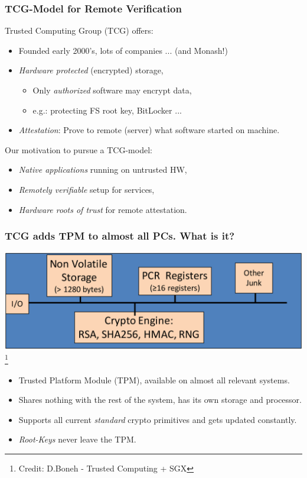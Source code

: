 \documentclass[aspectratio=169] {beamer}
\begin{document}
\begin{frame}\frametitle{TCG-Model for Remote Verification}
	\begin{minipage}{6.5cm}
	Trusted Computing Group (TCG) offers:
		\begin{itemize}
			\item Founded early 2000's, lots of companies ... (and Monash!)
			\item \emph{Hardware protected} (encrypted) storage,
			\begin{itemize}
				\item Only \emph{authorized} software may encrypt data,
				\item e.g.: protecting FS root key, BitLocker ...
			\end{itemize}
			\item \emph{Attestation}: Prove to remote (server) what software started on machine.
		\end{itemize}
	\end{minipage}
	\hfill
	\begin{minipage}{5cm}
	Our motivation to pursue a TCG-model:
		\begin{itemize}
			\item \emph{Native applications} running on untrusted HW,
			\item \emph{Remotely verifiable} setup for services,
			\item \emph{Hardware roots of trust} for remote attestation.
		\end{itemize}
	\end{minipage}
\end{frame}

\begin{frame}\frametitle{TCG adds TPM to almost all PCs. What is it?}
\centering
\includegraphics[scale=.2]{bilder/boneh}\footnote{\scriptsize Credit: D.Boneh - Trusted Computing + SGX}
\begin{itemize}
	\item Trusted Platform Module (TPM), available on almost all relevant systems.
	\item Shares nothing with the rest of the system, has its own storage and processor.
	\item Supports all current \emph{standard} crypto primitives and gets updated constantly.
	\item \emph{Root-Keys} never leave the TPM.
\end{itemize}
\end{frame}
\end{document}
